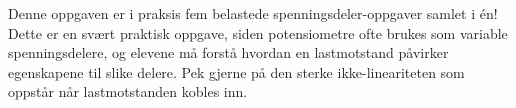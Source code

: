 
Denne oppgaven er i praksis fem belastede spenningsdeler-oppgaver samlet i én!  Dette er en svært praktisk oppgave, siden potensiometre ofte brukes som variable spenningsdelere, og elevene må forstå hvordan en lastmotstand påvirker egenskapene til slike delere.  Pek gjerne på den sterke ikke-lineariteten som oppstår når lastmotstanden kobles inn.




